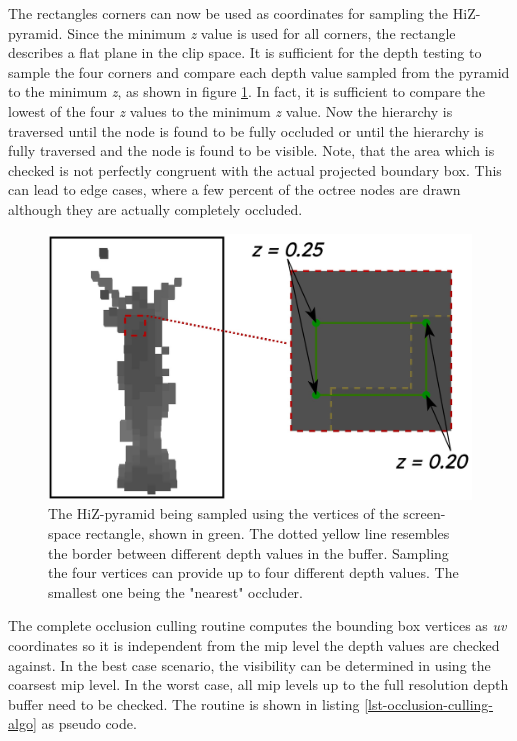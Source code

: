 \noindent
The rectangles corners can now be used as coordinates for sampling the \ac{HiZ}-pyramid. Since the minimum \emph{z} 
value is used for all corners, the rectangle describes a flat plane in the clip space. It is sufficient for the 
depth testing to sample the four corners and compare each depth value sampled from the pyramid to the minimum \emph{z},
as shown in figure \ref{fig:visibility-hiz-sampling}.
In fact, it is sufficient to compare the lowest of the four \emph{z} values to the minimum \emph{z} value. Now the 
hierarchy is traversed until the node is found to be fully occluded or until the hierarchy is fully traversed and the 
node is found to be visible. Note, that the area which is checked is not perfectly congruent with the actual projected 
boundary box. This can lead to edge cases, where a few percent of the octree nodes are drawn although they are actually 
completely occluded.

\begin{figure}[h]
    \centering
    \includegraphics[width=\linewidth]{images/graphics/visibility-hiz-sampling.jpg}
    \caption{The \ac{HiZ}-pyramid being sampled using the vertices of the screen-space rectangle, shown in green. 
    The dotted yellow line resembles the border between different depth values in the buffer. Sampling the four 
    vertices can provide up to four different depth values. The smallest one being the "nearest" occluder.}
    \label{fig:visibility-hiz-sampling}
\end{figure}


\noindent
The complete occlusion culling routine computes the bounding box vertices as \emph{uv} coordinates so it is independent 
from the mip level the depth values are checked against. In the best case scenario, the visibility can be determined in 
using the coarsest mip level. In the worst case, all mip levels up to the full resolution depth buffer need to be checked.
The routine is shown in listing \ref{lst-occlusion-culling-algo} as pseudo code.

